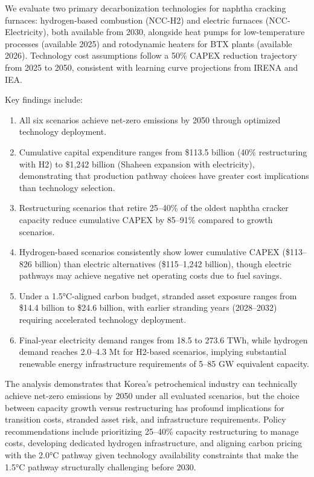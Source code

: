 \documentclass[12pt,a4paper]{article}
\begin{document}
We evaluate two primary decarbonization technologies for naphtha cracking furnaces: hydrogen-based combustion (NCC-H2) and electric furnaces (NCC-Electricity), both available from 2030, alongside heat pumps for low-temperature processes (available 2025) and rotodynamic heaters for BTX plants (available 2026). Technology cost assumptions follow a 50\% CAPEX reduction trajectory from 2025 to 2050, consistent with learning curve projections from IRENA and IEA.

Key findings include:

\begin{enumerate}
\item All six scenarios achieve net-zero emissions by 2050 through optimized technology deployment.
\item Cumulative capital expenditure ranges from \$113.5 billion (40\% restructuring with H2) to \$1,242 billion (Shaheen expansion with electricity), demonstrating that production pathway choices have greater cost implications than technology selection.
\item Restructuring scenarios that retire 25--40\% of the oldest naphtha cracker capacity reduce cumulative CAPEX by 85--91\% compared to growth scenarios.
\item Hydrogen-based scenarios consistently show lower cumulative CAPEX (\$113--826 billion) than electric alternatives (\$115--1,242 billion), though electric pathways may achieve negative net operating costs due to fuel savings.
\item Under a 1.5°C-aligned carbon budget, stranded asset exposure ranges from \$14.4 billion to \$24.6 billion, with earlier stranding years (2028--2032) requiring accelerated technology deployment.
\item Final-year electricity demand ranges from 18.5 to 273.6 TWh, while hydrogen demand reaches 2.0--4.3 Mt for H2-based scenarios, implying substantial renewable energy infrastructure requirements of 5--85 GW equivalent capacity.
\end{enumerate}

The analysis demonstrates that Korea's petrochemical industry can technically achieve net-zero emissions by 2050 under all evaluated scenarios, but the choice between capacity growth versus restructuring has profound implications for transition costs, stranded asset risk, and infrastructure requirements. Policy recommendations include prioritizing 25--40\% capacity restructuring to manage costs, developing dedicated hydrogen infrastructure, and aligning carbon pricing with the 2.0°C pathway given technology availability constraints that make the 1.5°C pathway structurally challenging before 2030.
\end{document}
